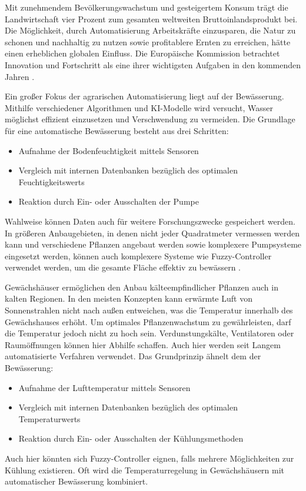 Mit zunehmendem Bevölkerungswachstum und gesteigertem Konsum trägt die Landwirtschaft vier Prozent zum gesamten weltweiten Bruttoinlandsprodukt bei. Die Möglichkeit, durch Automatisierung Arbeitskräfte einzusparen, die Natur zu schonen und nachhaltig zu nutzen sowie profitablere Ernten zu erreichen, hätte einen erheblichen globalen Einfluss. Die Europäische Kommission betrachtet Innovation und Fortschritt als eine ihrer wichtigsten Aufgaben in den kommenden Jahren .\cite{eu_agriculture}

Ein großer Fokus der agrarischen Automatisierung liegt auf der Bewässerung. Mithilfe verschiedener Algorithmen und KI-Modelle wird versucht, Wasser möglichst effizient einzusetzen und Verschwendung zu vermeiden. Die Grundlage für eine automatische Bewässerung besteht aus drei Schritten:\cite{kumar2018automatic}

\begin{itemize}
    \item Aufnahme der Bodenfeuchtigkeit mittels Sensoren
    \item Vergleich mit internen Datenbanken bezüglich des optimalen Feuchtigkeitswerts
    \item Reaktion durch Ein- oder Ausschalten der Pumpe
\end{itemize}

Wahlweise können Daten auch für weitere Forschungszwecke gespeichert werden. In größeren Anbaugebieten, in denen nicht jeder Quadratmeter vermessen werden kann und verschiedene Pflanzen angebaut werden sowie komplexere Pumpsysteme eingesetzt werden, können auch komplexere Systeme wie Fuzzy-Controller verwendet werden, um die gesamte Fläche effektiv zu bewässern .\cite{mushtaq2016automatic}

Gewächshäuser ermöglichen den Anbau kälteempfindlicher Pflanzen auch in kalten Regionen. In den meisten Konzepten kann erwärmte Luft von Sonnenstrahlen nicht nach außen entweichen, was die Temperatur innerhalb des Gewächshauses erhöht. Um optimales Pflanzenwachstum zu gewährleisten, darf die Temperatur jedoch nicht zu hoch sein. Verdunstungskälte, Ventilatoren oder Raumöffnungen können hier Abhilfe schaffen. Auch hier werden seit Langem automatisierte Verfahren verwendet. Das Grundprinzip ähnelt dem der Bewässerung:\cite{seesansui2020automatic}

\begin{itemize}
    \item Aufnahme der Lufttemperatur mittels Sensoren
    \item Vergleich mit internen Datenbanken bezüglich des optimalen Temperaturwerts
    \item Reaktion durch Ein- oder Ausschalten der Kühlungsmethoden
\end{itemize}
Auch hier könnten sich Fuzzy-Controller eignen, falls mehrere Möglichkeiten zur Kühlung existieren. Oft wird die Temperaturregelung in Gewächshäusern mit automatischer Bewässerung kombiniert.\cite{al-humairi2019smart}

